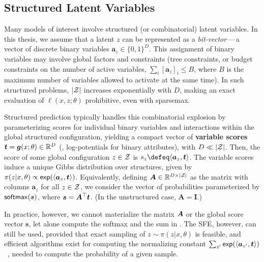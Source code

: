 \subsection{Structured Latent Variables}\label{sec:struct_lvm_bg}

\noindent Many models of interest involve structured (or combinatorial) latent
variables. In this thesis, we assume that a latent $z$ can be represented as a
    {\it bit-vector}\,---\,\ie a vector of discrete binary variables
$\bm{a}_{z} \in \{0, 1\}^D$. This assignment of binary variables may
involve global factors and constraints (\eg tree constraints, or
budget constraints on the number of active variables, \ie $\sum_i
    [\bm{a}_{z}]_i \le B$, where $B$ is the maximum number of variables
allowed to activate at the same time). In such structured problems,
$|\ZZ|$ increases exponentially with $D$, making an exact evaluation of
$\ell(x, z; \theta)$ prohibitive, even with sparsemax.

Structured prediction typically handles this combinatorial explosion
by parameterizing scores for individual binary variables and
interactions within the global structured configuration, yielding a
compact vector of \textbf{variable scores} $\bm{t} = \g(x; \theta)
    \in \mathbb{R}^D$ (\eg, log-potentials for binary attributes), with
$D \ll |\ZZ|$. Then, the score of some global configuration $z \in
    \ZZ$ is $s_z \defeq \DP{\bm{a}_z}{\bm{t}}$. The variable scores
induce a unique Gibbs distribution over structures, given by
$\pi(z|x,\theta) \propto \exp(\DP{\bm{a}_{z}}{\bm{t}})$.
Equivalently, defining $\bm{A} \in \mathbb{R}^{D \times |\ZZ|}$ as
the matrix with columns $\bm{a}_{z}$ for all $z \in \ZZ$, we consider
the vector of probabilities parameterized by $\softmax(\s)$, where
$\s=\bm{A}^\top \bm{t}$. (In the unstructured case, $\bm{A}=\bm{I}$.)

In practice, however, we cannot materialize the matrix $\AA$ or the
global score vector $\bm{s}$, let alone compute the softmax and the
sum in . The SFE, however, can still be used, provided
that exact sampling of $z\sim\pi(z | x, \theta)$ is feasible, and
efficient algorithms exist for computing the normalizing constant
$\sum_{z'}\exp(\DP{\bm{a}_{z'}}{\bm{t}})$~\citep{WJ2008}, needed to
compute the probability of a given sample.
